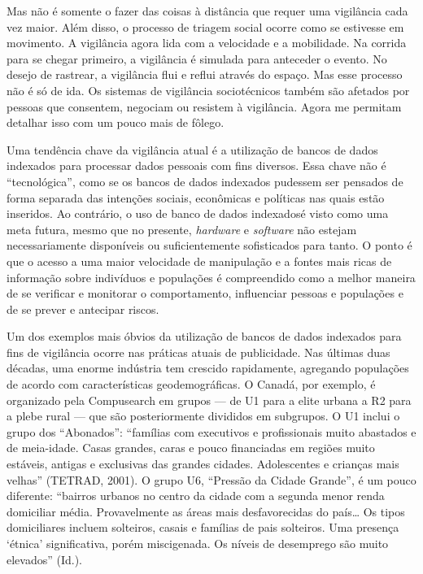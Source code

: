 Mas não é somente o fazer das coisas à distância que requer uma
vigilância cada vez maior. Além disso, o processo de triagem social
ocorre como se estivesse em movimento. A vigilância agora lida com a
velocidade e a mobilidade. Na corrida para se chegar primeiro, a
vigilância é simulada para anteceder o evento. No desejo de rastrear, a
vigilância flui e reflui através do espaço. Mas esse processo não é só
de ida. Os sistemas de vigilância sociotécnicos também são afetados por
pessoas que consentem, negociam ou resistem à vigilância. Agora me
permitam detalhar isso com um pouco mais de fôlego.

Uma tendência chave da vigilância atual é a utilização de bancos de
dados indexados para processar dados pessoais com fins diversos. Essa
chave não é ``tecnológica'', como se os bancos de dados indexados
pudessem ser pensados de forma separada das intenções sociais,
econômicas e políticas nas quais estão inseridos. Ao contrário, o uso de
banco de dados indexadosé visto como uma meta futura, mesmo que no
presente, \emph{hardware} e \emph{software} não estejam necessariamente
disponíveis ou suficientemente sofisticados para tanto. O ponto é que o
acesso a uma maior velocidade de manipulação e a fontes mais ricas de
informação sobre indivíduos e populações é compreendido como a melhor
maneira de se verificar e monitorar o comportamento, influenciar pessoas
e populações e de se prever e antecipar riscos.

Um dos exemplos mais óbvios da utilização de bancos de dados indexados
para fins de vigilância ocorre nas práticas atuais de publicidade. Nas
últimas duas décadas, uma enorme indústria tem crescido rapidamente,
agregando populações de acordo com características geodemográficas. O
Canadá, por exemplo, é organizado pela Compusearch em grupos --- de U1
para a elite urbana a R2 para a plebe rural --- que são posteriormente
divididos em subgrupos. O U1 inclui o grupo dos ``Abonados'': ``famílias
com executivos e profissionais muito abastados e de meia-idade. Casas
grandes, caras e pouco financiadas em regiões muito estáveis, antigas e
exclusivas das grandes cidades. Adolescentes e crianças mais velhas''
(TETRAD, 2001). O grupo U6, ``Pressão da Cidade Grande'', é um pouco
diferente: ``bairros urbanos no centro da cidade com a segunda menor
renda domiciliar média. Provavelmente as áreas mais desfavorecidas do
país\ldots{} Os tipos domiciliares incluem solteiros, casais e famílias
de pais solteiros. Uma presença `étnica' significativa, porém
miscigenada. Os níveis de desemprego são muito elevados'' (Id.).

